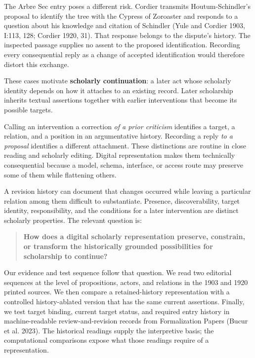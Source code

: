 \documentclass[11pt,a4paper]{article}
\begin{document}
The Arbre Sec entry poses a different risk. Cordier transmits Houtum-Schindler's proposal to identify the tree with the Cypress of Zoroaster and responds to a question about his knowledge and citation of Schindler (Yule and Cordier 1903, I:113, 128; Cordier 1920, 31). That response belongs to the dispute's history. The inspected passage supplies no assent to the proposed identification. Recording every consequential reply as a change of accepted identification would therefore distort this exchange.


These cases motivate \textbf{scholarly continuation}: a later act whose scholarly identity depends on how it attaches to an existing record. Later scholarship inherits textual assertions together with earlier interventions that become its possible targets.


Calling an intervention a correction \emph{of a prior criticism} identifies a target, a relation, and a position in an argumentative history. Recording a reply \emph{to a proposal} identifies a different attachment. These distinctions are routine in close reading and scholarly editing. Digital representation makes them technically consequential because a model, schema, interface, or access route may preserve some of them while flattening others.


A revision history can document that changes occurred while leaving a particular relation among them difficult to substantiate. Presence, discoverability, target identity, responsibility, and the conditions for a later intervention are distinct scholarly properties. The relevant question is:


\begin{quote}
\textbf{How does a digital scholarly representation preserve, constrain, or transform the historically grounded possibilities for scholarship to continue?}
\end{quote}

Our evidence and test sequence follow that question. We read two editorial sequences at the level of propositions, actors, and relations in the 1903 and 1920 printed sources. We then compare a retained-history representation with a controlled history-ablated version that has the same current assertions. Finally, we test target binding, current target status, and required entry history in machine-readable review-and-revision records from Formalization Papers (Bucur et al. 2023). The historical readings supply the interpretive basis; the computational comparisons expose what those readings require of a representation.
\end{document}
